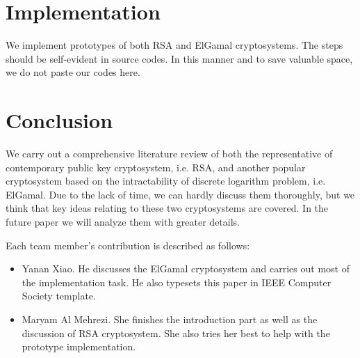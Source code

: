 \documentclass[12pt,journal,compsoc]{IEEEtran}
\begin{document}







\section{Implementation}
\label{sec:implementation}
We implement prototypes of both RSA and ElGamal cryptosystems. The
steps should be self-evident in source codes. In this manner and to
save valuable space, we do not paste our codes here.






\section{Conclusion}
We carry out a comprehensive literature review of both the
representative of contemporary public key cryptosystem, i.e. RSA, and
another popular cryptosystem based on the intractability of discrete
logarithm problem, i.e. ElGamal. Due to the lack of time, we can
hardly discuss them thoroughly, but we think that key ideas relating to
these two cryptosystems are covered. In the future paper we will
analyze them with greater details.
\par
Each team member's contribution is described as follows:
\begin{itemize}
\item Yanan Xiao. He discusses the ElGamal cryptosystem and carries
  out most of the implementation task. He also typesets this paper in
  IEEE Computer Society template.
\item Maryam Al Mehrezi. She finishes the introduction part as well as
  the discussion of RSA cryptosystem. She also tries her best to help
  with the prototype implementation. 
\end{itemize}
\end{document}
